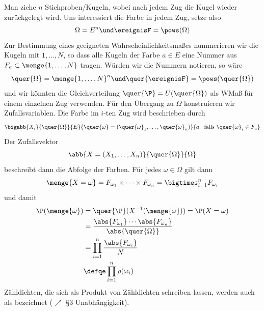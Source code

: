 Man ziehe $n$ Stichproben/Kugeln, wobei nach jedem Zug die Kugel wieder zurückgelegt wird. Uns interessiert die Farbe in jedem Zug, setze also
\begin{equation*}
	\Omega = E^n \und \ereignisF = \pows(\Omega) 
\end{equation*}
Zur Bestimmung eines geeigneten Wahrscheinlichkeitsmaßes nummerieren wir die Kugeln mit $1,\dots, N$, so dass alle Kugeln der Farbe $a \in E$ eine Nummer aus $F_{a} \subset \menge{1,\dots, N}$ tragen. Würden wir die Nummern notieren, so wäre
\begin{equation*}
	\quer{\Omega} = \menge{1,\dots, N}^n \und \quer{\ereignisF} = \pows(\quer{\Omega})
\end{equation*}
und wir könnten die Gleichverteilung $\quer{\P} = U(\quer{\Omega})$ als WMaß für einem einzelnen Zug verwenden. Für den Übergang zu $\Omega$ konstruieren wir  Zufallsvariablen. Die Farbe im $i$-ten Zug wird beschrieben durch
\begin{equation*}
	\bigabb{X_i}{\quer{\Omega}}{E}{\quer{\omega} = \left( \quer{\omega}_1, \dots, \quer{\omega}_n \right)}{a \enskip \text{ falls } \quer{\omega}_i \in F_a}
\end{equation*}
Der Zufallsvektor
\begin{equation*}
	\abb{X = (X_1, \dots, X_n)}{\quer{\Omega}}{\Omega}
\end{equation*}
beschreibt dann die Abfolge der Farben. Für jedes $\omega \in \Omega$ gilt dann
\begin{equation*}
	\menge{X = \omega} = F_{\omega_1} \times \cdots \times F_{\omega_n} = \bigtimes_{i=1}^{n} F_{\omega_i}
\end{equation*}
und damit
\begin{equation*}
	\begin{aligned}
    \P(\menge{\omega}) 
    &= \quer{\P}(X^{-1}(\menge{\omega})) = \P(X=\omega)\\
    &= \frac{\abs{F_{\omega_1}} \cdots \abs{F_{\omega_n}}}{\abs{\quer{\Omega}}}\\
    &= \prod_{i=1}^{n} \frac{\abs{F_{\omega_i}}}{N} \\
    &\defqe \prod_{i=1}^{n} \rho(\omega_i)
    \end{aligned}
\end{equation*}
Zähldichten, die sich als Produkt von Zähldichten schreiben lassen, werden auch als  bezeichnet ($\nearrow$  \S 3 Unabhängigkeit).

